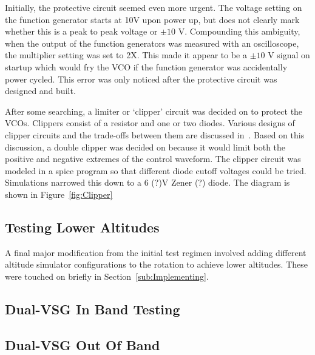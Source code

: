  Initially, the protective circuit seemed even more urgent. The voltage setting on the function generator starts at 10V upon power up, but does not clearly mark whether this is a peak to peak voltage or $\pm10$ V. Compounding this ambiguity, when the output of the function generators was measured with an oscilloscope, the multiplier setting was set to 2X. This made it appear to be a $\pm10$ V signal on startup which would fry the VCO if the function generator was accidentally power cycled. This error was only noticed after the protective circuit was designed and built. 

After some searching, a limiter or `clipper' circuit was decided on to protect the VCOs. Clippers consist of a resistor and one or two diodes. Various designs of clipper circuits and the trade-offs between them are discussed in~\cite{sedra_microelectronic_2015}. Based on this discussion, a double clipper was decided on because it would limit both the positive and negative extremes of the control waveform. The clipper circuit was modeled in a spice program so that different diode cutoff voltages could be tried. Simulations narrowed this down to a 6 (?)V Zener (?) diode. The diagram is shown in Figure~\ref{fig:Clipper}

\subsection{Testing Lower Altitudes}
A final major modification from the initial test regimen involved adding different altitude simulator configurations to the rotation to achieve lower altitudes. These were touched on briefly in Section~\ref{sub:Implementing}.

\subsection{Dual-VSG In Band Testing}

\subsection{Dual-VSG Out Of Band}